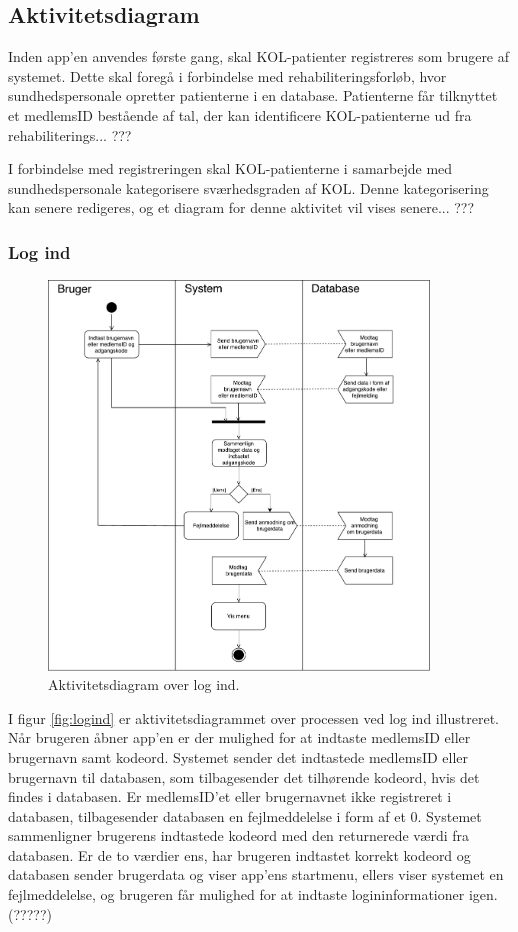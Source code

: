 \subsection{Aktivitetsdiagram}
Inden app'en anvendes første gang, skal KOL-patienter registreres som brugere af systemet. Dette skal foregå i forbindelse med rehabiliteringsforløb, hvor sundhedspersonale opretter patienterne i en database. Patienterne får tilknyttet et medlemsID bestående af tal, der kan identificere KOL-patienterne ud fra rehabiliterings... ???



I forbindelse med registreringen skal KOL-patienterne i samarbejde med sundhedspersonale kategorisere sværhedsgraden af KOL. Denne kategorisering kan senere redigeres, og et diagram for denne aktivitet vil vises senere... ???

\subsubsection{Log ind}

\begin{figure} [H]
\centering
\includegraphics[width=0.9\textwidth]{figures/aktivitetsdiagram/Logind}
\caption{Aktivitetsdiagram over log ind.}
\label{fig:Logind}
\end{figure}

I figur \autoref{fig:logind} er aktivitetsdiagrammet over processen ved log ind illustreret. Når brugeren åbner app'en er der mulighed for at indtaste medlemsID eller brugernavn samt kodeord. Systemet sender det indtastede medlemsID eller brugernavn til databasen, som tilbagesender det tilhørende kodeord, hvis det findes i databasen. Er medlemsID'et eller brugernavnet ikke registreret i databasen, tilbagesender databasen en fejlmeddelelse i form af et 0. Systemet sammenligner brugerens indtastede kodeord med den returnerede værdi fra databasen. Er de to værdier ens, har brugeren indtastet korrekt kodeord og databasen sender brugerdata og viser app'ens startmenu, ellers viser systemet en fejlmeddelelse, og brugeren får mulighed for at indtaste logininformationer igen. (?????)


